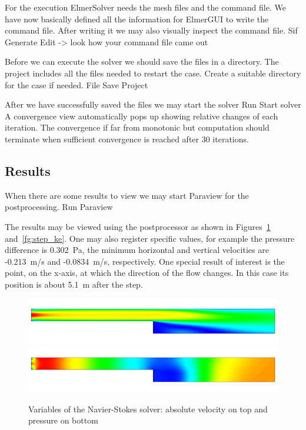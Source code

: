 For the execution 
ElmerSolver needs the mesh files and the command file. We have now basically defined
all the information for ElmerGUI to write the command file. After writing it we may also visually 
inspect the command file.
\ttbegin
Sif 
  Generate
  Edit -> look how your command file came out  
\ttend

Before we can execute the solver we should save the files in a directory. The project includes
all the files needed to restart the case. Create a suitable directory for the case if needed. 
\ttbegin
File 
  Save Project
\ttend

After we have successfully saved the files we may start the solver
\ttbegin
Run
  Start solver
\ttend
A convergence view automatically pops up showing relative changes of each iteration.
The convergence if far from monotonic but computation should terminate 
when sufficient convergence is reached after 30 iterations.


\subsection*{Results}

When there are some results to view we may start Paraview for the postprocessing.
\ttbegin
Run
  Paraview
\ttend

The results may be viewed using the postprocessor as shown in 
Figures~\ref{fg:step_ns} and~\ref{fg:step_ke}.
One may also register specific values,
for example the pressure difference is 0.302~Pa, the minimum horizontal and vertical velocities
are -0.213~m/s and -0.0834~m/s, respectively.
One special result of interest 
is the point, on the x-axis, at which the direction of the flow changes. 
In this case its position is about 5.1~m after the step. 

\begin{figure}[h]
\centering
\includegraphics[width=15cm]{step_ke_velo}
\includegraphics[width=15cm]{step_ke_pres}
\caption{Variables of the Navier-Stokes solver: absolute velocity on top and 
pressure on bottom}\label{fg:step_ns}
\end{figure} 

